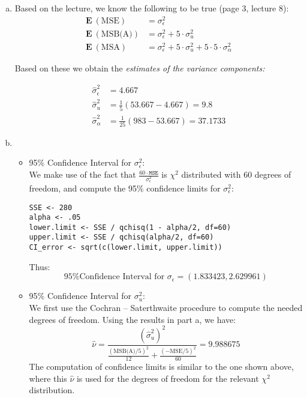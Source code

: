 \documentclass[paper=a4, fontsize=11pt]{scrartcl} %
\begin{document}
\begin{enumerate}[(a)]
\item  Based on the lecture, we know the following to be true (page 3, lecture 8):
\begin{align*} 
 \mathbf{E}\  (\text{MSE}) &= \sigma^2_\epsilon\\ 
\mathbf{E}\  (\text{MSB(A)})  &= \sigma^2_\epsilon + 5 \cdot \sigma^2_u \\
\mathbf{E}\  (\text{MSA})  &= \sigma^2_\epsilon + 5 \cdot \sigma^2_u + 5\cdot 5 \cdot \sigma^2_\alpha
\end{align*}

Based on these we obtain the \emph{estimates of the variance components:}

\begin{align*} 
\hat \sigma^2_\epsilon &=  4.667\\ 
\hat \sigma^2_u &= \frac{1}{5} (53.667 - 4.667) = 9.8\\
\hat \sigma^2_\alpha &= \frac{1}{25} (983 - 53.667) = 37.1733
\end{align*}

\item 
\begin{itemize}
\item 95\% Confidence Interval for $\sigma^2_\epsilon:$\\

We make use of the fact that $\frac{60 \cdot \texttt{MSE}}{\sigma^2_\epsilon}$ is $\chi^2$ distributed with $60$ degrees of freedom, and compute the 95\% confidence limits for $\sigma^2_\epsilon$:\\
\begin{verbatim}
SSE <- 280
alpha <- .05
lower.limit <- SSE / qchisq(1 - alpha/2, df=60)
upper.limit <- SSE / qchisq(alpha/2, df=60)
CI_error <- sqrt(c(lower.limit, upper.limit))
\end{verbatim}
\bigskip

Thus:
$$
 \boxed{\text{95\% Confidence Interval for } \sigma_\epsilon = ( 1.833423,  2.629961 )}
$$

\bigskip
\item 95\% Confidence Interval for $\sigma^2_u:$\\

We first  use the Cochran -- Saterthwaite procedure to compute the needed degrees of freedom.  Using the results in part a, we have:
$$
\hat \nu = \frac{ (\hat \sigma^2_u)^2 }{ \frac{(\text{MSB(A)} / 5)^2}{12} + \frac{(-\text{MSE}/5)^2}{60} } = 9.988675
$$
The computation of confidence limits is similar to the one shown above, where this $
\hat \nu$ is used for the degrees of freedom for the relevant $\chi^2$ distribution. \\


\end{itemize}
\end{enumerate}
\end{document}

